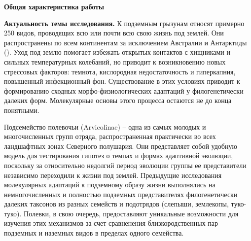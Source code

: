 
\hspace{-10mm}\textbf{\Large Общая характеристика работы}

\vspace{3mm}
\textbf{Актуальность темы исследования.} К подземным грызунам относят примерно 250 видов, проводящих всю или почти всю свою жизнь под землей. Они распространены по всем континентам за исключением Австралии и Антарктиды (\cite{Fang2015}). Уход под землю помогает избежать открытых контактов с хищниками и сильных температурных колебаний, но приводит к возникновению новых стрессовых факторов: темнота, кислородная недостаточность и гиперкапния, повышенный инфекционный фон. Существование в этих условиях приводит к формированию сходных морфо-физиологических адаптаций у филогенетически далеких форм. Молекулярные основы этого процесса остаются не до конца понятными. %

Подсемейство полевочьи (Arvicolinae) -- одна из самых молодых и многочисленных групп отряда, распространенная практически во всех ландшафтных зонах Северного полушария. Они представляет собой удобную модель для тестирования гипотез о темпах и формах адаптивной эволюции, поскольку за относительно недолгий период эволюции группы ее представители независимо переходили к жизни под землей. Предыдущие исследования молекулярных адаптаций к подземному образу жизни выполнялись на немногочисленных и полностью подземных представителях филогенетически далеких таксонов из разных семейств и подотрядов (слепыши, землекопы, туко-туко). Полевки, в свою очередь, предоставляют уникальные возможности для изучения этих механизмов за счет сравненения близкородственных пар подземных и наземных видов в пределах одного семейства. 




